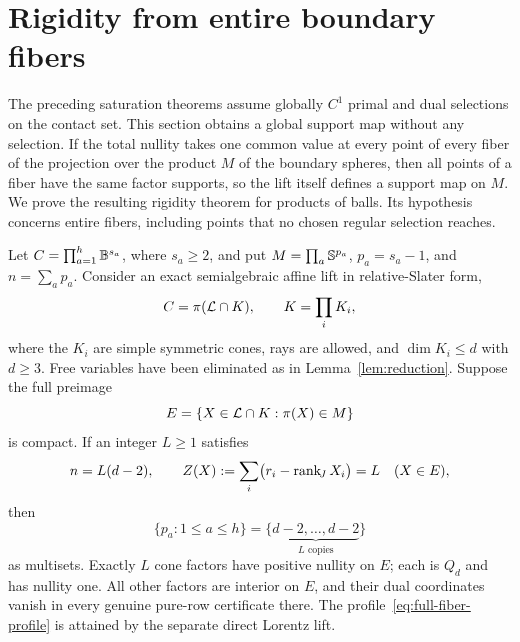 \section{Rigidity from entire boundary fibers}\label{sec:full-fiber-rigidity}

The preceding saturation theorems assume globally $C^1$ primal and dual
selections on the contact set. This section obtains a global support map
without any selection. If the total nullity takes one common value at
every point of every fiber of the projection over the product $M$ of the
boundary spheres, then all points of a fiber have the same factor
supports, so the lift itself defines a support map on $M$. We prove the resulting rigidity theorem for products of balls.
Its hypothesis concerns entire fibers, including points that no chosen
regular selection reaches.

\begin{theorem}\label{thm:full-fiber-rigidity}
Let $C=\prod_{a=1}^h\mathbb B^{s_a}$, where $s_a\geq2$, and put
$M=\prod_a\mathbb S^{p_a}$, $p_a=s_a-1$, and $n=\sum_a p_a$.
Consider an exact semialgebraic affine lift in relative-Slater form,
\[
 C=\pi(\mathcal L\cap K),\qquad K=\prod_iK_i,
\]
where the $K_i$ are simple symmetric cones, rays are allowed, and
$\dim K_i\leq d$ with $d\geq3$. Free variables have been eliminated as
in Lemma~\ref{lem:reduction}. Suppose the full preimage
\[
 E=\{X\in\mathcal L\cap K:\pi(X)\in M\}
\]
is compact. If an integer $L\geq1$ satisfies
\begin{equation}\label{eq:full-fiber-hypothesis}
 n=L(d-2),\qquad
 Z(X):=\sum_i\bigl(r_i-\operatorname{rank}_{\!J} X_i\bigr)=L\quad(X\in E),
\end{equation}
then
\begin{equation}\label{eq:full-fiber-profile}
 \{p_a:1\leq a\leq h\}
 =\{\underbrace{d-2,\ldots,d-2}_{L\text{ copies}}\}
\end{equation}
as multisets. Exactly $L$ cone factors have positive nullity on $E$;
each is $Q_d$ and has nullity one. All other factors are interior on $E$,
and their dual coordinates vanish in every genuine pure-row certificate
there.
The profile~\eqref{eq:full-fiber-profile} is attained by the separate
direct Lorentz lift.
\end{theorem}

